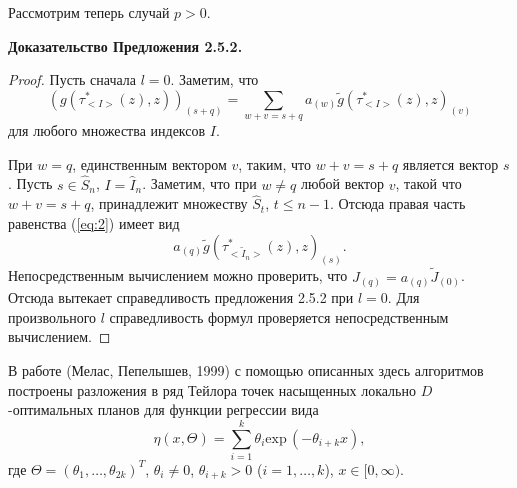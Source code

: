                 Рассмотрим теперь случай $p>0$.

                \textbf{ Доказательство Предложения 2.5.2.} \begin{proof}
                Пусть сначала $l=0$.
                Заметим, что \begin{equation} \left(g(\tau^*_{<I>}(z),z)\right)_{(s+q)}=
                \sum_{w+v=s+q}a_{(w)}\tilde g(\tau^*_{<I>}(z),z)_{(v)} \label{eq:2}
                \end{equation} для любого множества индексов $I$.

                При $w=q$, единственным вектором $v$, таким, что $w+v=s+q$ является
                вектор $s$. Пусть $s \in \hat S_n$, $I= \hat I_{n}$. Заметим, что
                при $w\ne q$ любой вектор $v$, такой что $w+v=s+q$, принадлежит
                множеству $\hat S_t$, $t\leq n-1$. Отсюда правая часть равенства
                (\ref{eq:2}) имеет вид
                $$
                a_{(q)}\tilde g\left(\tau^*_{<\tilde I_n>}(z),z\right)_{(s)}.
                $$
                Непосредственным вычислением можно проверить, что $J_{(q)}=a_{(q)}
                \tilde J_{(0)}$. Отсюда вытекает справедливость предложения 2.5.2
                при $l=0$. Для произвольного $l$ справедливость формул проверяется
                непосредственным вычислением.\end{proof}

                В работе (Мелас, Пепелышев, 1999) с помощью описанных здесь
                алгоритмов построены разложения в ряд Тейлора точек насыщенных
                локально $D$-оптимальных планов для функции регрессии вида
                $$
                \eta(x,\Theta)=\sum^k_{i=1}\theta_i {\mbox{exp}}\,(-\theta_{i+k}x),
                $$
                где $\Theta=(\theta_1,\ldots,\theta_{2k})^T$, $\theta_i\ne 0$,
                $\theta_{i+k}>0$ ($i=1,\ldots,k$), $x\in [0,\infty)$.


